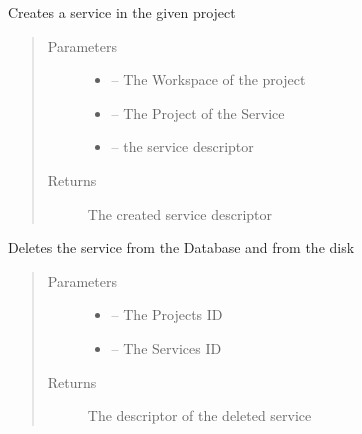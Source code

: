 \documentclass[letterpaper,10pt,english]{sphinxmanual}
\begin{document}
\begin{fulllineitems}
\label{_source/son_editor.impl:son_editor.impl.servicesimpl.create_service}
Creates a service in the given project
\begin{quote}\begin{description}
\item[{Parameters}] \leavevmode\begin{itemize}
\item {} 
 -- The Workspace of the project

\item {} 
 -- The Project of the Service

\item {} 
 -- the service descriptor

\end{itemize}

\item[{Returns}] \leavevmode
The created service descriptor

\end{description}\end{quote}

\end{fulllineitems}


\begin{fulllineitems}
\label{_source/son_editor.impl:son_editor.impl.servicesimpl.delete_service}
Deletes the service from the Database and from the disk
\begin{quote}\begin{description}
\item[{Parameters}] \leavevmode\begin{itemize}
\item {} 
 -- The Projects ID

\item {} 
 -- The Services ID

\end{itemize}

\item[{Returns}] \leavevmode
The descriptor of the deleted service

\end{description}\end{quote}

\end{fulllineitems}
\end{document}

